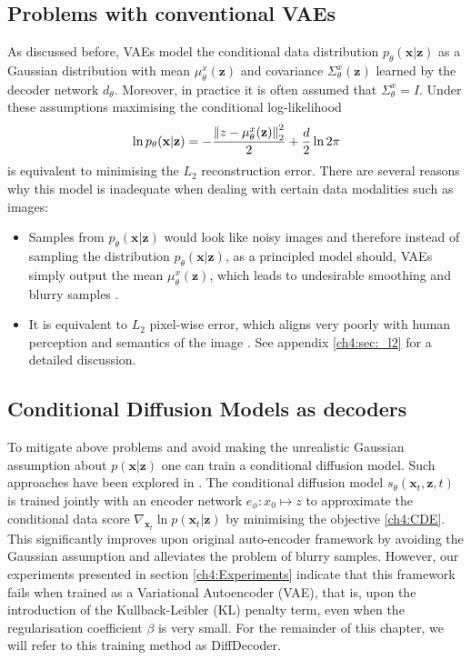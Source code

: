 \subsection{Problems with conventional VAEs}
As discussed before, VAEs model the conditional data distribution $p_\theta (\textbf{x}| \textbf{z})$ as a Gaussian distribution with mean $\mu^x_\theta( \textbf{z})$ and covariance $\Sigma^x_\theta( \textbf{z})$ learned by the decoder network $d_\theta$. Moreover, in practice it is often assumed that $\Sigma^x_\theta = I$. Under these assumptions maximising the conditional log-likelihood $$\ln p_\theta (\textbf{x} | \textbf{z}) = -\frac{\left\lVert z - \mu^x_\theta( \textbf{z}) \right\rVert_2^2}{2} + \frac{d}{2}\ln{2\pi}$$ is equivalent to minimising the $L_2$ reconstruction error. There are several reasons why this model is inadequate when dealing with certain data modalities such as images:
\begin{itemize}
    \item Samples from $p_\theta(\textbf{x} | \textbf{z})$ would look like noisy images and therefore instead of sampling the distribution $p_\theta(\textbf{x}| \textbf{z})$, as a principled model should, VAEs simply output the mean $\mu^x_\theta( \textbf{z})$, which leads to undesirable smoothing and blurry samples \cite{zaho2017understanding_vaes}.
    \item It is equivalent to $L_2$ pixel-wise error, which aligns very poorly with human perception and semantics of the image \cite{zhang2018lpips}. See appendix  \ref{ch4:sec:_l2} for a detailed discussion.
\end{itemize}

\subsection{Conditional Diffusion Models as decoders}
To mitigate above problems and avoid making the unrealistic Gaussian assumption about $p(\textbf{x}| \textbf{z})$ one can train a conditional diffusion model. Such approaches have been explored in \cite{preechakul2022diffusion_decoder, yang2023ldiffusion_decoder_compression}. The conditional diffusion model $s_\theta(\textbf{x}_t, \textbf{z},t)$ is trained jointly with an encoder network $e_\phi : x_0 \mapsto z$ to approximate the conditional data score $\nabla_{\textbf{x}_t}  \ln{p(\textbf{x}_t | \textbf{z})}$ by minimising the objective \ref{ch4:CDE}. This significantly improves upon original auto-encoder framework by avoiding the Gaussian assumption and alleviates the problem of blurry samples. However, our experiments presented in section \ref{ch4:Experiments} indicate that this framework fails when trained as a Variational Autoencoder (VAE), that is, upon the introduction of the Kullback-Leibler (KL) penalty term, even when the regularisation coefficient $\beta$ is very small. For the remainder of this chapter, we will refer to this training method as DiffDecoder.

